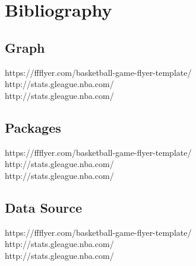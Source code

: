 \documentclass[11pt,fleqn]{book} %
\begin{document}
\vspace{1em}




\chapter{Bibliography}

\section{Graph}

\vspace{1em}

https://ffflyer.com/basketball-game-flyer-template/\\
http://stats.gleague.nba.com/\\
http://stats.gleague.nba.com/\\

\section{Packages}

\vspace{1em}

https://ffflyer.com/basketball-game-flyer-template/\\
http://stats.gleague.nba.com/\\
http://stats.gleague.nba.com/\\

\section{Data Source}

\vspace{1em}

https://ffflyer.com/basketball-game-flyer-template/\\
http://stats.gleague.nba.com/\\
http://stats.gleague.nba.com/\\
\end{document}
